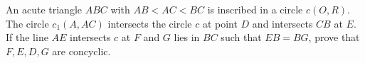 An acute triangle $ABC$ with $AB<AC<BC$ is inscribed in a circle $c(O,R)$. The circle $c_1(A,AC)$ intersects the circle $c$ at point $D$ and intersects $CB$ at $E$. If the line $AE$ intersects $c$ at $F$ and $G$ lies in $BC$ such that $EB=BG$,  prove that $F,E,D,G$ are concyclic.
